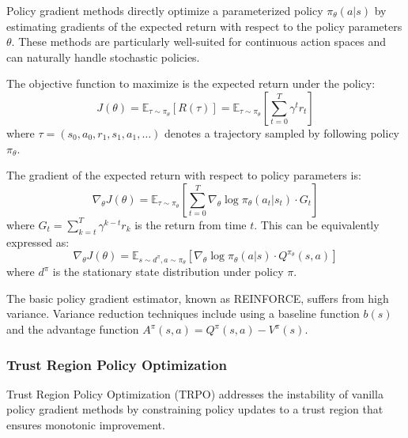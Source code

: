 Policy gradient methods directly optimize a parameterized policy $\pi_\theta(a|s)$ by estimating gradients of the expected return with respect to the policy parameters $\theta$. These methods are particularly well-suited for continuous action spaces and can naturally handle stochastic policies.

The objective function to maximize is the expected return under the policy:
\begin{equation}
J(\theta) = \mathbb{E}_{\tau \sim \pi_\theta}[R(\tau)] = \mathbb{E}_{\tau \sim \pi_\theta}\left[\sum_{t=0}^{T} \gamma^t r_t\right]
\end{equation}
where $\tau = (s_0, a_0, r_1, s_1, a_1, \ldots)$ denotes a trajectory sampled by following policy $\pi_\theta$.

\begin{theorem}
\label{thm:policy_gradient}
The gradient of the expected return with respect to policy parameters is:
\begin{equation}
\nabla_\theta J(\theta) = \mathbb{E}_{\tau \sim \pi_\theta}\left[\sum_{t=0}^{T} \nabla_\theta \log \pi_\theta(a_t|s_t) \cdot G_t\right]
\end{equation}
where $G_t = \sum_{k=t}^{T} \gamma^{k-t} r_k$ is the return from time $t$. This can be equivalently expressed as:
\begin{equation}
\nabla_\theta J(\theta) = \mathbb{E}_{s \sim d^\pi, a \sim \pi_\theta}\left[\nabla_\theta \log \pi_\theta(a|s) \cdot Q^{\pi_\theta}(s,a)\right]
\end{equation}
where $d^\pi$ is the stationary state distribution under policy $\pi$.
\end{theorem}

The basic policy gradient estimator, known as REINFORCE, suffers from high variance. Variance reduction techniques include using a baseline function $b(s)$ and the advantage function $A^\pi(s,a) = Q^\pi(s,a) - V^\pi(s)$.

\subsubsection{Trust Region Policy Optimization}

Trust Region Policy Optimization (TRPO) addresses the instability of vanilla policy gradient methods by constraining policy updates to a trust region that ensures monotonic improvement.

